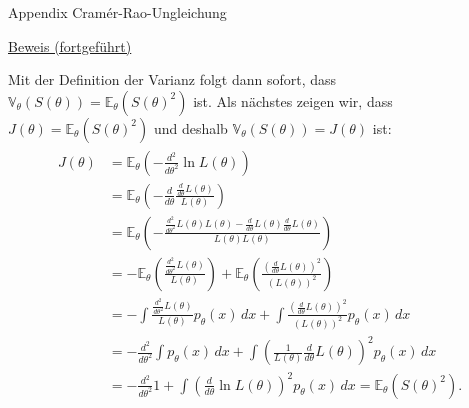\documentclass[
  8pt,
  ignorenonframetext,
]{beamer}
\begin{document}
\begin{frame}{Appendix \textbar{} Cramér-Rao-Ungleichung}
\protect\hypertarget{appendix-cramuxe9r-rao-ungleichung-7}{}
\footnotesize

\underline{Beweis (fortgeführt)}

Mit der Definition der Varianz folgt dann sofort, dass
\(\mathbb{V}_\theta(S(\theta)) = \mathbb{E}_\theta(S(\theta)^2)\) ist.
Als nächstes zeigen wir, dass
\(J(\theta) = \mathbb{E}_\theta(S(\theta)^2)\) und deshalb
\(\mathbb{V}_\theta(S(\theta)) = J(\theta)\) ist:  \tiny
\begin{align}
\begin{split}
J(\theta)
& = \mathbb{E}_\theta\left(-\frac{d^2}{d\theta^2} \ln L(\theta)\right) \\
& = \mathbb{E}_\theta\left(-\frac{d}{d\theta} \frac{\frac{d}{d\theta}L(\theta)}{L(\theta)}\right) \\
& = \mathbb{E}_\theta\left(-\frac{\frac{d^2}{d\theta^2} L(\theta) L(\theta) - \frac{d}{d\theta}L(\theta)\frac{d}{d\theta}L(\theta)}{L(\theta)L(\theta)}\right) \\
& = - \mathbb{E}_\theta\left(\frac{\frac{d^2}{d\theta^2} L(\theta)}{L(\theta)}\right) +
\mathbb{E}_\theta\left(\frac{\left(\frac{d}{d\theta}L(\theta)\right)^2}{(L(\theta))^2}\right) \\
& = - \int \frac{\frac{d^2}{d\theta^2} L(\theta)}{L(\theta)} p_\theta(x) \,dx +
      \int \frac{\left(\frac{d}{d\theta}L(\theta)\right)^2}{(L(\theta))^2} p_\theta(x) \,dx \\
& = - \frac{d^2}{d\theta^2} \int p_\theta(x) \,dx +
      \int \left(\frac{1}{L(\theta)}\frac{d}{d\theta}L(\theta)\right)^2 p_\theta(x) \,dx \\
& = - \frac{d^2}{d\theta^2} 1 +
\int \left(\frac{d}{d\theta} \ln L(\theta) \right)^2 p_\theta(x) \,dx
= \mathbb{E}_\theta\left(S(\theta)^2\right).
\end{split}
\end{align}
\end{frame}
\end{document}
